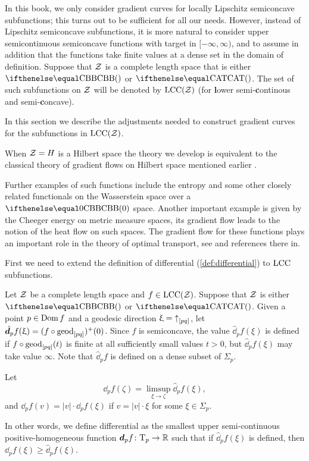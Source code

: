 In this book, we only consider gradient curves for locally Lipschitz semiconcave subfunctions;
this turns out to be sufficient for all our needs.
However, 
instead of Lipschitz semiconcave subfunctions,
it is more natural to consider upper semicontinuous semiconcave functions
with target in $[-\infty,\infty)$,
and to assume in addition that 
the functions take finite values at a dense set in the domain of definition.
Suppose that $\mathcal{Z}$ is a complete length space that is either $\Alex{}$ or $\CAT{}$.
The set of such subfunctions on $\mathcal{Z}$ will be denoted by 
$\mathrm{LCC}(\mathcal{Z})$ (for \textbf{l}ower semi-\textbf{c}ontinous and semi-\textbf{c}oncave).

In this section we describe the adjustments needed
to construct gradient curves for the subfunctions in $\mathrm{LCC}(\mathcal{Z})$.

When $\mathcal{Z}=H$ is a Hilbert space the theory we develop is equivalent to the classical theory of gradient flows on Hilbert space mentioned earlier \cite{Brezis-book}.

Further examples of such functions include the entropy and some other closely related functionals on the Wasserstein space over a $\Alex0$ space.
Another important example is given by the Cheeger energy on metric measure spaces, its gradient flow leads to the notion of the heat flow on such spaces.
The gradient flow for these functions plays an important role in the theory of optimal transport, see \cite{villani} and references there in. 


First we need to extend the definition of differential (\ref{def:differential}) to $\mathrm{LCC}$ subfunctions.

Let $\mathcal{Z}$ be a complete length space and $f\in\LSCSC(\spc{Z})$.
Suppose that $\mathcal{Z}$ is either $\Alex{}$ or $\CAT{}$.
Given a point $p\in \Dom f$ and a geodesic direction $\upxi={\uparrow}_{[{p}{q}]}$, 
let 
$\hat \dd_pf(\xi)=(f\circ\geod_{[pq]})^+(0)$.
Since $f$ is semiconcave, the value $\hat \dd_pf(\xi)$ is defined if $f\circ\geod_{[pq]}(t)$ is finite at all sufficiently small values $t>0$,
but $\hat \dd_pf(\xi)$ may take value $\infty$. 
Note that $\hat \dd_pf$ is defined on a dense subset of $\Sigma_p$.

Let 
\[\dd_pf(\zeta)=\limsup_{\xi\to\zeta}\hat\dd_pf(\xi),\]
and $\dd_pf(v)=|v|\cdot \dd_pf(\xi)$ if $v=|v|\cdot\xi$ for some $\xi\in\Sigma_p$.

In other words, we define differential as the smallest 
upper semi-continuous  positive-homogeneous function $\dd_pf\:\T_p\to\RR$
such that if $\hat\dd_pf(\xi)$ is defined, then $\dd_pf(\xi)\ge \hat \dd_pf(\xi)$.




